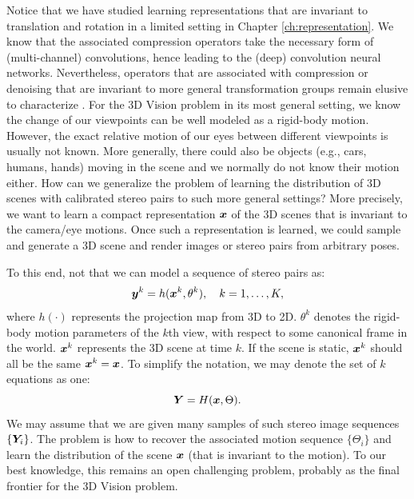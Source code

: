 \documentclass[../../book-main.tex]{subfiles}
\begin{document}
Notice that we have studied learning representations that are invariant to translation and rotation in a limited setting in Chapter \ref{ch:representation}. We know that the associated compression operators take the necessary form of (multi-channel) convolutions, hence leading to the (deep) convolution neural networks. Nevertheless, operators that are associated with compression or denoising that are invariant to more general transformation groups remain elusive to characterize \cite{cohen2016group}.  
For the 3D Vision problem in its most general setting, we know the change of our viewpoints can be well modeled as a rigid-body motion. However, the exact relative motion of our eyes between different viewpoints is usually not known. More generally, there could also be objects (e.g., cars, humans, hands) moving in the scene and we normally do not know their motion either. How can we generalize the problem of learning the distribution of 3D scenes with calibrated stereo pairs to such more general settings? More precisely, we want to learn a compact representation $\bm{x}$ of the 3D scenes that is invariant to the camera/eye motions. Once such a representation is learned, we could sample and generate a 3D scene and render images or stereo pairs from arbitrary poses. 


To this end, not that we can model a sequence of stereo pairs as:
\begin{equation}
    \bm{y}^k = h(\bm{x}^k, \theta^k), \quad k=1, \ldots, K,
\end{equation}
where $h(\cdot)$ represents the projection map from 3D to 2D. $\theta^k$ denotes the rigid-body motion parameters of the $k$th view, with respect to some canonical frame in the world. $\bm{x}^k$ represents the 3D scene at time $k$. If the scene is static, $\bm{x}^k$ should all be the same $\bm{x}^k = \bm{x}$. To simplify the notation, we may denote the set of $k$ equations as one:
\begin{equation}
    \bm{Y} = H(\bm{x},\Theta). 
\end{equation}
We may assume that we are given many samples of such stereo image sequences $\{\bm{Y}_i\}$. The problem is how to recover the associated motion sequence $\{\Theta_i\}$ and learn the distribution of the scene $\bm{x}$ (that is invariant to the motion). To our best knowledge, this remains an open challenging problem, probably as the final frontier for the 3D Vision problem. 
\end{document}
